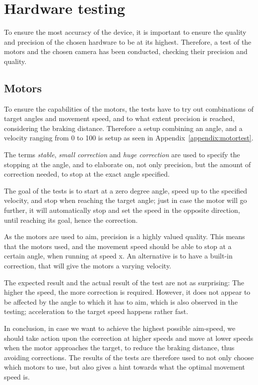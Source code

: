 \section{Hardware testing}\label{des:sec:hwtest}
To ensure the most accuracy of the device, it is important to ensure the quality and precision of the chosen hardware to be at its highest.
Therefore, a test of the motors and the chosen camera has been conducted, checking their precision and quality.

\subsection*{Motors}
To ensure the capabilities of the motors, the tests have to try out combinations of target angles and movement speed, and to what extent precision is reached, considering the braking distance.
Therefore a setup combining an angle, and a velocity ranging from 0 to 100 is setup as seen in Appendix~\ref{appendix:motortest}.

The terms \textit{stable}, \textit{small correction} and \textit{huge correction} are used to specify the stopping at the angle, and to elaborate on, not only precision, but the amount of correction needed, to stop at the exact angle specified.

The goal of the tests is to start at a zero degree angle, speed up to the specified velocity, and stop when reaching the target angle; just in case the motor will go further, it will automatically stop and set the speed in the opposite direction, until reaching its goal, hence the correction.

As the motors are used to aim, precision is a highly valued quality.
This means that the motors used, and the movement speed should be able to stop at a certain angle, when running at speed x.
An alternative is to have a built-in correction, that will give the motors a varying velocity.

The expected result and the actual result of the test are not as surprising: The higher the speed, the more correction is required.
However, it does not appear to be affected by the angle to which it has to aim, which is also observed in the testing; acceleration to the target speed happens rather fast.

In conclusion, in case we want to achieve the highest possible aim-speed, we should take action upon the correction at higher speeds and move at lower speeds when the motor approaches the target, to reduce the braking distance, thus avoiding corrections.
The results of the tests are therefore used to not only choose which motors to use, but also gives a hint towards what the optimal movement speed is.

